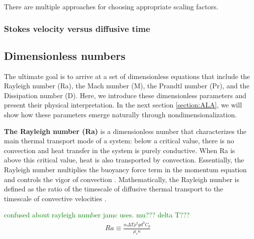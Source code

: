 \documentclass[a4paper]{article}
\begin{document}
There are multiple approaches for choosing appropriate scaling factors. 

\subsubsection{Stokes velocity versus diffusive time} \label{section:stokes_diff}

\subsection{Dimensionless numbers}
The ultimate goal is to arrive at a set of dimensionless equations that include the Rayleigh number (Ra), the Mach number (M), the Prandtl number (Pr), and the Dissipation number (D). 
Here, we introduce these dimensionless parameters and present their physical interpretation. In the next section \ref{section:ALA}, we will show how these 
parameters emerge naturally through nondimensionalization. 

\textbf{The Rayleigh number (Ra)} is a dimensionless number that characterizes the main thermal transport mode of a system: 
below a critical value, there is no convection and heat transfer in the system is purely conductive. When Ra is above this critical value, heat is also transported by convection. 
Essentially, the Rayleigh number multiplies the buoyancy force term in the momentum equation and controls the vigor of convection \autocite{scto01}. 
Mathematically, the Rayleigh number is defined as the ratio of the timescale of diffusive thermal transport to the timescale of convective velocities \autocite{scto01}. 

\textcolor{green}{confused about rayleigh number jamc uses. mu??? delta T??? } 
\begin{align}
  \mathit{Ra} \equiv
  \frac{\alpha \Delta T \rho^2  g  d^3  C_p}
       {\mu_r  \kappa}
  \label{eq:6.10.20}
\end{align}
\end{document}
